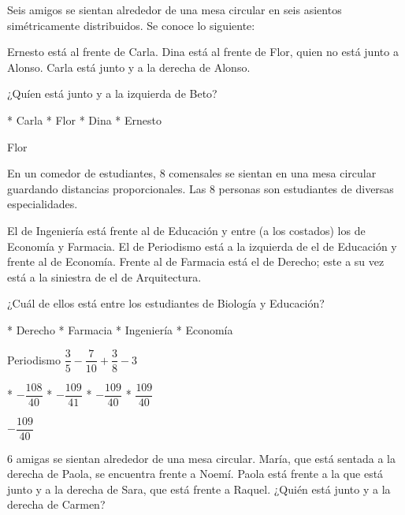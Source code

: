 \begin{mini}[.8]
	Seis amigos se sientan alrededor de una mesa circular en seis asientos sim\'etricamente distribuidos. Se conoce lo siguiente:
	\begin{itemize}
		\ii Ernesto est\'a al frente de Carla.
		\ii Dina est\'a al frente de Flor, quien no est\'a junto a Alonso.
		\ii Carla est\'a junto y a la derecha de Alonso.
	\end{itemize}
	¿Qu\'ien est\'a junto y a la izquierda de Beto?
\end{mini}
\begin{mini}[.7]
	\begin{enum*}
		* Carla
		* Flor
		* Dina
		* Ernesto
	\end{enum*}
\end{mini}
Flor
\begin{mini}[.8]
	En un comedor de estudiantes, $8$ comensales se sientan en una mesa circular guardando distancias proporcionales. Las $8$ personas son estudiantes de diversas especialidades.
	\begin{itemize}
		\ii El de Ingenier\'ia est\'a frente al de Educaci\'on y entre (a los costados) los de Econom\'ia y Farmacia.
		\ii El de Periodismo est\'a a la izquierda de el de Educaci\'on y frente al de Econom\'ia.
		\ii Frente al de Farmacia est\'a el de Derecho; este a su vez est\'a a la siniestra de el de Arquitectura.
	\end{itemize}
	¿Cu\'al de ellos est\'a entre los estudiantes de Biolog\'ia y Educaci\'on?
\end{mini}
\begin{mini}[.8]
	\begin{enum*}
		* Derecho
		* Farmacia
		* Ingenier\'ia
		* Econom\'ia
	\end{enum*}
\end{mini}
Periodismo
$\dfrac{3}{5}-\dfrac{7}{10}+\dfrac{3}{8}-3$
\begin{mini}[.7]
	\begin{enum*}
		* $-\dfrac{108}{40}$
		* $-\dfrac{109}{41}$
		* $-\dfrac{109}{40}$
		* $\dfrac{109}{40}$
	\end{enum*}
\end{mini}
$-\dfrac{109}{40}$
\begin{mini}[.7]
	$6$ amigas se sientan alrededor de una mesa circular. Mar\'ia, que est\'a sentada a la derecha de Paola, se encuentra frente a Noem\'i. Paola est\'a frente a la que est\'a junto y a la derecha de Sara, que est\'a frente a Raquel. ¿Qui\'en est\'a junto y a la derecha de Carmen?
\end{mini}
